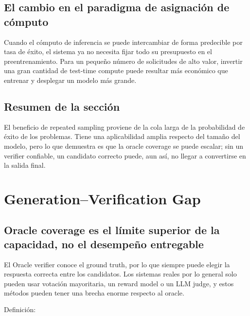 \documentclass[a4paper]{article}
\begin{document}
\subsection{El cambio en el paradigma de asignación de cómputo}

Cuando el cómputo de inferencia se puede intercambiar de forma predecible por tasa de éxito, el sistema ya no necesita fijar todo su presupuesto en el preentrenamiento. Para un pequeño número de solicitudes de alto valor, invertir una gran cantidad de test-time compute puede resultar más económico que entrenar y desplegar un modelo más grande.


\subsection{Resumen de la sección}

El beneficio de repeated sampling proviene de la cola larga de la probabilidad de éxito de los problemas. Tiene una aplicabilidad amplia respecto del tamaño del modelo, pero lo que demuestra es que la oracle coverage se puede escalar; sin un verifier confiable, un candidato correcto puede, aun así, no llegar a convertirse en la salida final.
\section{Generation--Verification Gap}

\subsection{Oracle coverage es el límite superior de la capacidad, no el desempeño entregable}

El Oracle verifier conoce el ground truth, por lo que siempre puede elegir la respuesta correcta entre los candidatos. Los sistemas reales por lo general solo pueden usar votación mayoritaria, un reward model o un LLM judge, y estos métodos pueden tener una brecha enorme respecto al oracle.


Definición:
\end{document}
